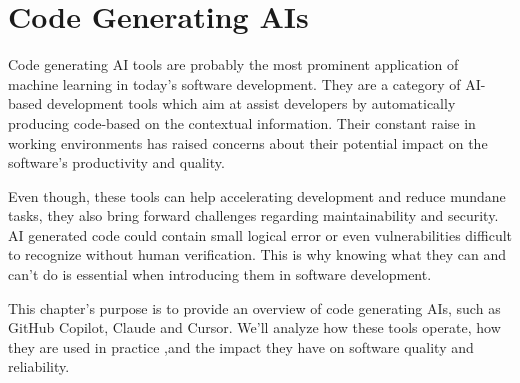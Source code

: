 \chapter{Code Generating AIs}

Code generating AI tools are probably the most prominent application of machine learning in today's software development. They are a category of AI-based development tools which aim at assist developers by automatically producing code-based on the contextual information. Their constant raise in working environments has raised concerns about their potential impact on the software's productivity and quality.

Even though, these tools can help accelerating development and reduce mundane tasks, they also bring forward challenges regarding  maintainability and security. AI generated code could contain small logical error or even vulnerabilities difficult to recognize without human verification. This is why knowing what they can and can't do is essential when introducing them in software development.

This chapter's purpose is to provide an overview of code generating AIs, such as GitHub Copilot, Claude and Cursor. We'll analyze how these tools operate, how they are used in practice ,and the impact they have on software quality and reliability.

\newpage

\begin{table}[h]
\small
\centering
\caption{Feature-based comparison of selected Code Generating AIs}
\label{table_3.1}
\end{table}


